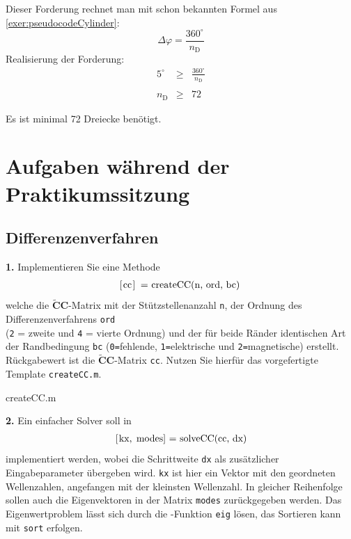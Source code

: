 \documentclass[Protokollheft.tex]{subfiles}
\begin{document}
	Dieser Forderung rechnet man mit schon bekannten Formel aus \ref{exer:pseudocodeCylinder}:
		$$\Delta \varphi = \frac{360^\circ}{n_\text{D}}$$
	Realisierung der Forderung:
	\begin{eqnarray*}
		5^{\circ} &\geq& \frac{360^\circ}{n_\text{D}}\\
		\\
		n_\text{D} &\geq& 72
	\end{eqnarray*}

	Es ist minimal 72 Dreiecke benötigt.

\section{Aufgaben während der Praktikumssitzung}
{\subsection{Differenzenverfahren}}

        \begin{framed}
	\noindent \textbf{1.} Implementieren Sie eine Methode
                    \begin{align}
                        \lstinline{[cc] = createCC(n, ord, bc)}\; \label{meth:createCC}
                    \end{align}     
                    welche die $\tilde{\textbf{C}}\textbf{C}$-Matrix mit der Stützstellenanzahl \lstinline{n}, der Ordnung des Differenzenverfahrens
                    \lstinline{ord}\\ (\lstinline{2} = zweite und \lstinline{4} = vierte Ordnung) und der für beide Ränder identischen Art der Randbedingung \lstinline{bc} (\lstinline{0=}fehlende, \lstinline{1=}elektrische und  \lstinline{2=}magnetische) erstellt.
                    Rückgabewert ist die $\tilde{\textbf{C}}\textbf{C}$-Matrix \lstinline{cc}. Nutzen Sie hierfür das vorgefertigte Template \lstinline{createCC.m}.\label{exer:createCC}
\end{framed}

 {createCC.m}

        \begin{framed}
	\noindent \textbf{2.} Ein einfacher Solver soll in
                    \begin{align}
                        \lstinline{[kx, modes] = solveCC(cc, dx)} \label{meth:solveCC}
                    \end{align}
                    implementiert werden, wobei die Schrittweite \lstinline{dx} als zusätzlicher Eingabeparameter übergeben wird.
                    \lstinline{kx} ist hier ein Vektor mit den geordneten Wellenzahlen, angefangen mit der kleinsten Wellenzahl. In gleicher
                    Reihenfolge sollen auch die Eigenvektoren in der Matrix \lstinline{modes} zurückgegeben werden.
                    Das Eigenwertproblem lässt sich durch die \matlab-Funktion \lstinline{eig} lösen, das Sortieren kann mit \lstinline{sort} erfolgen.\label{exer:solveCC}
\end{framed}
\end{document}
